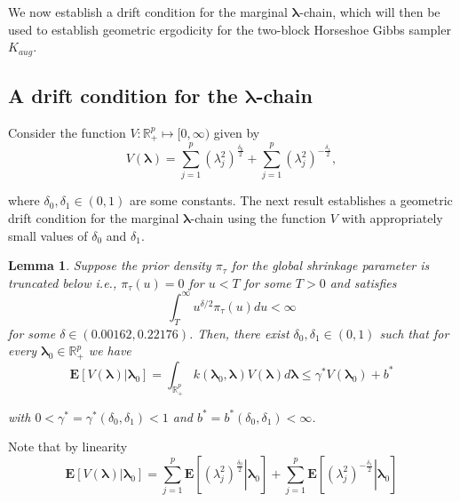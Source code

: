 \documentclass[noinfoline,11pt]{imsart}
\numberwithin{equation}{section}
\theoremstyle{plain}
\newtheorem{lem}{Lemma}[section]
\newcommand{\bl}{\boldsymbol{\lambda}}
\newcommand{\E}{\boldsymbol{E}}
\begin{document}
\noindent
We now establish a drift condition for the marginal ${\boldsymbol \lambda}$-chain, which will then be used to establish geometric ergodicity for 
the two-block Horseshoe Gibbs sampler $K_{aug}$. 

\subsection{A drift condition for the ${\bl}$-chain}\label{Horseshoe:drift:condition}

\noindent
Consider the function $V:\mathbb{R}_+^p\mapsto[0,\infty)$ given by 
\begin{equation}\label{driftfunction}
    V\left(\mathbf{\bl}\right)=\sum_{j=1}^p\left(\lambda_j^2\right)^{\frac{\delta_0}{2}}+\sum_{j=1}^p\left(\lambda_j^2\right)^{-\frac{\delta_1}{2}}, 
\end{equation}

\noindent
where $\delta_0,\delta_1\in(0,1)$ are some constants. The next result establishes a geometric drift condition for the marginal ${\boldsymbol \lambda}$-chain using the function $V$ with appropriately small values of $\delta_0$ and $\delta_1$. 
\begin{lem}\label{Theorem1}
Suppose the prior density $\pi_\tau$ for the global shrinkage parameter is 
truncated below i.e., $\pi_\tau (u) = 0$ for $ u < T$ for some $T > 0$ and satisfies $$\int_T^{\infty} u^{\delta/2}\pi_\tau (u)du<\infty$$ for some $\delta\in (0.00162,0.22176)$.  
Then, there exist $\delta_0, \delta_1 \in (0,1)$ such that for every 
$\bl_0\in \mathbb{R}_+^p$ we have 
\begin{equation}\label{driftcondition}
    \E\left[\left.V\left(\mathbf{\bl}\right)\right|\mathbf{\bl}_0\right] = 
    \int_{\mathbb{R}_+^p} k\left( \mathbf{\bl}_0,\mathbf{\bl} \right) 
    V(\mathbf{\bl}) d {\mathbf{\bl}} \leq \gamma^* V\left(\mathbf{\bl}_0\right)+b^*
\end{equation}
 
\noindent
with $0<\gamma^*=\gamma^*\left(\delta_0,\delta_1\right)<1$ and $b^* = b^* 
\left( \delta_0, \delta_1 \right) <\infty$. 
\end{lem}

\proof Note that by linearity 
\begin{equation} \label{expectations:linearity}
\E\left[\left.V\left(\mathbf{\bl}\right)\right|\mathbf{\bl}_0\right] = 
\sum_{j=1}^p \E\left[\left. \left(\lambda_j^2\right)^{\frac{\delta_0}{2}} \right|\mathbf{\bl}_0\right] + \sum_{j=1}^p \E\left[\left. \left(\lambda_j^2\right)^{-\frac{\delta_1}{2}} \right|\mathbf{\bl}_0\right]
\end{equation}
\end{document}
